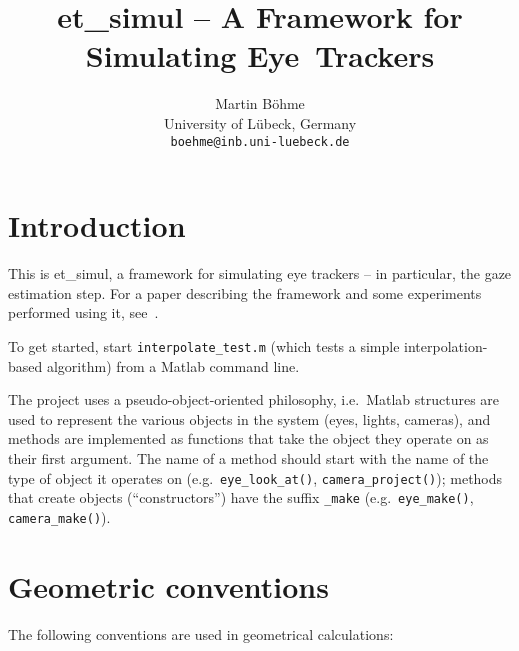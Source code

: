 \documentclass{scrartcl}
\title{et\_simul -- A Framework for Simulating Eye~Trackers}
\author{Martin B\"ohme \\
University of L\"ubeck, Germany \\
\texttt{boehme@inb.uni-luebeck.de}}
\date{}
\begin{document}
\maketitle

\section{Introduction}

This is et\_simul, a framework for simulating eye trackers -- in particular,
the gaze estimation step. For a paper describing the framework and some
experiments performed using it, see~\cite{BoDoGrMaBa08}.

To get started, start \texttt{interpolate\_test.m} (which tests a simple
interpolation-based algorithm) from a Matlab command line. 

The project uses a pseudo-object-oriented philosophy, i.e.\ Matlab structures
are used to represent the various objects in the system (eyes, lights,
cameras), and methods are implemented as functions that take the object they
operate on as their first argument. The name of a method should start with the
name of the type of object it operates on (e.g.\ \texttt{eye\_look\_at()},
\texttt{camera\_project()}); methods that create objects (``constructors'') 
have the suffix \texttt{\_make} (e.g.\ \texttt{eye\_make()}, 
\texttt{camera\_make()}).

\section{Geometric conventions}

The following conventions are used in geometrical calculations:
\end{document}
